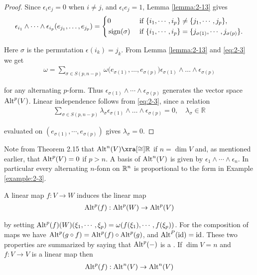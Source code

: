 \begin{proof}
  Since $\epsilon_i{e_j} = 0$ when $i\neq j$, and $\epsilon_i{e_j}= 1$, Lemma \ref{lemma:2-13} gives 
  \begin{align}\label{eq:2-3}
    \epsilon_{i_1}\wedge\cdots\wedge\epsilon_{i_p}(e_{j_1},\ldots,e_{j_p})
    = \left\{\begin{aligned}
      & 0             && \text{ if } \{i_1, \cdots, i_p\}\neq \{j_1, \cdots, j_p\},\\
      & \operatorname{sign}(\sigma) && \text{ if } \{i_1, \cdots, i_p\} = \{j_{\sigma(1)}, \cdots, j_{\sigma(p)}\}.
    \end{aligned}\right.
  \end{align}

  Here $\sigma$ is the permutation $\epsilon(i_k) = j_k$. From Lemma \ref{lemma:2-13} and \eqref{eq:2-3} we get
  \begin{align*}
    \omega = \sum_{\sigma\in S(p,n-p)}\omega\big(e_{\sigma(1)},\ldots,e_{\sigma(p)}\big)
      \epsilon_{\sigma(1)}\wedge\ldots\wedge\epsilon_{\sigma(p)}
  \end{align*}

  for any alternating $p$-form. Thus $\epsilon_{\sigma(1)}\wedge\cdots\wedge\epsilon_{\sigma(p)}$ generates 
  the vector space $\operatorname{Alt}^p(V)$. Linear independence follows from \eqref{eq:2-3}, since a relation
  \begin{align*}
    \sum_{\sigma\in S(p,n-p)}\lambda_{\sigma}\epsilon_{\sigma(1)}\wedge\ldots\wedge\epsilon_{\sigma(p)}=0,\quad\lambda_{\sigma}\in\mathbb{R}
  \end{align*}

  evaluated on $(e_{\sigma(1)}, \cdots, e_{\sigma(p)})$ gives $\lambda_{\sigma} = 0$.
\end{proof}

Note from Theorem 2.15 that $\alt^n(V)\xra[\cong]\RR$ if $n = \dim V$ and, as mentioned
earlier, that $\operatorname{Alt}^p(V) = 0$ if $p > n$. A basis of $\operatorname{Alt}^n(V)$ is given by $\epsilon_{1}\wedge\cdots\wedge\epsilon_{n}$.
In particular every alternating $n$-fonn on $\mathbb{R}^n$ is proportional to the form in Example \ref{example:2-3}.

A linear map $f:V\to W$ induces the linear map 
\begin{align}\label{eq:2-4}
  \operatorname{Alt}^p(f): \operatorname{Alt}^p(W)\to\operatorname{Alt}^p(V)
\end{align}

by setting $\operatorname{Alt}^p(f)(W)(\xi_1, \cdots, \xi_p) = \omega(f(\xi_1), \cdots, f(\xi_p))$. For the composition of
maps we have $\operatorname{Alt}^p(g\circ f) = \operatorname{Alt}^p(f)\circ\operatorname{Alt}^p(g)$, and $\operatorname{Alt}^P(\operatorname{id}) = \operatorname{id}$. These two
properties are summarized by saying that $\operatorname{Alt}^p(-)$ is a . If $\dim V = n$ and 
$f:V\to V$ is a linear map then
\begin{align*}
  \operatorname{Alt}^p(f): \operatorname{Alt}^n(V)\to\operatorname{Alt}^n(V)
\end{align*}

